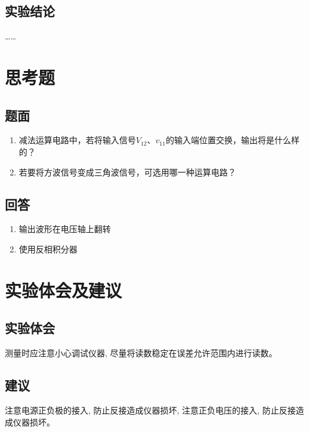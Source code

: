 \documentclass[10pt, a4paper]{article} %
\begin{document}
\subsection{实验结论}
……
\section{思考题}
\subsection{题面}
\begin{enumerate}[leftmargin=50pt,label=(\arabic*)] %
    \item 减法运算电路中，若将输入信号$V_{12}$、$v_{11}$的输入端位置交换，输出将是什么样的？
    \item 若要将方波信号变成三角波信号，可选用哪一种运算电路？

\end{enumerate}
\subsection{回答}

\begin{enumerate}[leftmargin=50pt,label=(\arabic*)] %
    \item 输出波形在电压轴上翻转
    \item 使用反相积分器
\end{enumerate}

\section{实验体会及建议}
\subsection{实验体会}
测量时应注意小心调试仪器, 尽量将读数稳定在误差允许范围内进行读数。
\subsection{建议}
注意电源正负极的接入, 防止反接造成仪器损坏, 注意正负电压的接入, 防止反接造成仪器损坏。
\end{document}
